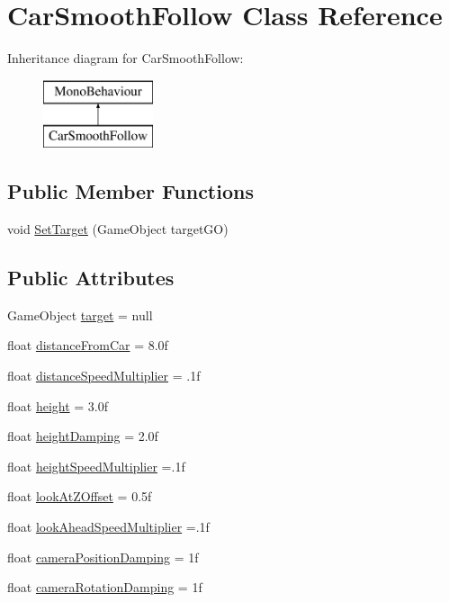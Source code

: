 \hypertarget{class_car_smooth_follow}{}\section{Car\+Smooth\+Follow Class Reference}
\label{class_car_smooth_follow}
Inheritance diagram for Car\+Smooth\+Follow\+:\begin{figure}[H]
\begin{center}
\leavevmode
\includegraphics[height=2.000000cm]{class_car_smooth_follow}
\end{center}
\end{figure}
\subsection*{Public Member Functions}
\begin{DoxyCompactItemize}
\item 
void \hyperlink{class_car_smooth_follow_a2d712b91afa5dd0b05e656906696e790}{Set\+Target} (Game\+Object target\+GO)
\end{DoxyCompactItemize}
\subsection*{Public Attributes}
\begin{DoxyCompactItemize}
\item 
Game\+Object \hyperlink{class_car_smooth_follow_a00e638b32e3abe0f51c6c3b8a8803934}{target} = null
\item 
float \hyperlink{class_car_smooth_follow_ae108427df824574bfa4824d30eca82f6}{distance\+From\+Car} = 8.\+0f
\item 
float \hyperlink{class_car_smooth_follow_ad1825b1da8185eb42067cb85c194f359}{distance\+Speed\+Multiplier} = .\+1f
\item 
float \hyperlink{class_car_smooth_follow_a43a9e0612db6ec97c974f73ea624eae2}{height} = 3.\+0f
\item 
float \hyperlink{class_car_smooth_follow_a2bea7fbf94973dfe7d817007c46c1ef0}{height\+Damping} = 2.\+0f
\item 
float \hyperlink{class_car_smooth_follow_a12d7cda902c087f43b97d8d8440b6d64}{height\+Speed\+Multiplier} =.\+1f
\item 
float \hyperlink{class_car_smooth_follow_ab06bbde8c0f233398b82422accf75545}{look\+At\+Z\+Offset} = 0.\+5f
\item 
float \hyperlink{class_car_smooth_follow_aad8cfb27b14d3321d2229426beaa572d}{look\+Ahead\+Speed\+Multiplier} =.\+1f
\item 
float \hyperlink{class_car_smooth_follow_af2dd261d565974b43d7514cd8f5e632c}{camera\+Position\+Damping} = 1f
\item 
float \hyperlink{class_car_smooth_follow_ab3914dc07dfa55c29f98e6da4481a40e}{camera\+Rotation\+Damping} = 1f
\end{DoxyCompactItemize}


